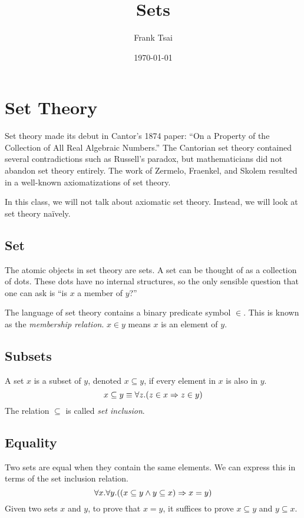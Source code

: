 \documentclass{amsart}
\title{Sets}
\author{Frank Tsai}
\date{\today}
\begin{document}
\maketitle
\tableofcontents

\section{Set Theory}
\label{sec:basic-set-theory}

Set theory made its debut in Cantor's 1874 paper: ``On a Property of the Collection of All Real Algebraic Numbers.''
The Cantorian set theory contained several contradictions such as Russell's paradox, but mathematicians did not abandon set theory entirely.
The work of Zermelo, Fraenkel, and Skolem resulted in a well-known axiomatizations of set theory.

In this class, we will not talk about axiomatic set theory.
Instead, we will look at set theory na\"ively.

\subsection{Set}
\label{sec:set}

The atomic objects in set theory are sets.
A set can be thought of as a collection of dots.
These dots have no internal structures, so the only sensible question that one can ask is ``is $x$ a member of $y$?''

The language of set theory contains a binary predicate symbol $\in$.
This is known as the \emph{membership relation}.
$x \in y$ means $x$ is an element of $y$.

\subsection{Subsets}
\label{sec:subsets}

\begin{defn}
  A set $x$ is a subset of $y$, denoted $x \subseteq y$, if every element in $x$ is also in $y$.
  \[
    x \subseteq y \equiv \forall z.(z \in x \Rightarrow z \in y)
  \]
  The relation $\subseteq$ is called \emph{set inclusion}.
\end{defn}

\subsection{Equality}
\label{sec:equality}

Two sets are equal when they contain the same elements.
We can express this in terms of the set inclusion relation.
\[
  \forall x. \forall y. ((x \subseteq y \wedge y \subseteq x) \Rightarrow x = y)
\]
Given two sets $x$ and $y$, to prove that $x = y$, it suffices to prove $x \subseteq y$ and $y \subseteq x$.
\end{document}
